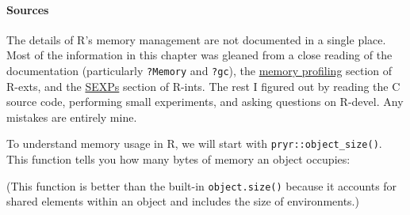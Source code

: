 \begin{Shaded}
\begin{Highlighting}[]
\NormalTok{(}\NormalTok{)}
\NormalTok{(}\NormalTok{)}
\NormalTok{(}\NormalTok{)}
\NormalTok{(}\NormalTok{)}
\end{Highlighting}
\end{Shaded}

\paragraph{Sources}

The details of R's memory management are not documented in a single
place. Most of the information in this chapter was gleaned from a close
reading of the documentation (particularly \texttt{?Memory} and
\texttt{?gc}), the
\href{http://cran.r-project.org/doc/manuals/R-exts.html\#Profiling-R-code-for-memory-use}{memory
profiling} section of R-exts, and the
\href{http://cran.r-project.org/doc/manuals/R-ints.html\#SEXPs}{SEXPs}
section of R-ints. The rest I figured out by reading the C source code,
performing small experiments, and asking questions on R-devel. Any
mistakes are entirely mine.


To understand memory usage in R, we will start with
\texttt{pryr::object\_size()}. This function tells you how many bytes of
memory an object occupies: 

\begin{Shaded}
\begin{Highlighting}[]
\NormalTok{(}\NormalTok{:}\NormalTok{)}
\end{Highlighting}
\end{Shaded}

(This function is better than the built-in \texttt{object.size()}
because it accounts for shared elements within an object and includes
the size of environments.)

